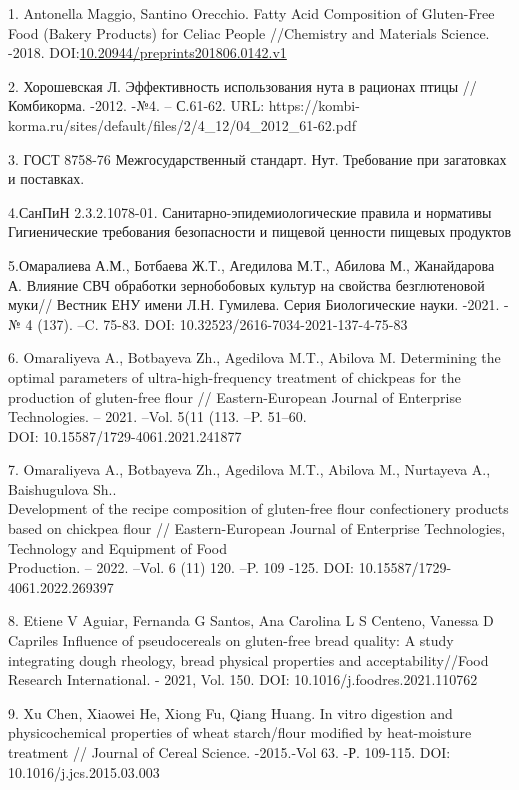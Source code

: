 	\begin{references}

1. Antonella Maggio, Santino Orecchio. Fatty Acid Composition of
Gluten-Free Food (Bakery Products) for Celiac People //Chemistry and
Materials Science. -2018.
DOI:\href{http://dx.doi.org/10.20944/preprints201806.0142.v1}{10.20944/preprints201806.0142.v1}

2. Хорошевская Л. Эффективность использования нута в рационах птицы //
Комбикорма. -2012. -№4. -- С.61-62. URL:
https://kombi-korma.ru/sites/default/files/2/4\_12/04\_2012\_61-62.pdf

3. ГОСТ 8758-76 Межгосударственный стандарт. Нут. Требование при
загатовках и поставках.

4.СанПиН 2.3.2.1078-01. Санитарно-эпидемиологические правила и нормативы
Гигиенические требования безопасности и пищевой ценности пищевых
продуктов

5.Омаралиева А.М., Ботбаева Ж.Т., Агедилова М.Т., Абилова М.,
Жанайдарова А. Влияние СВЧ обработки зернобобовых культур на свойства
безглютеновой муки// Вестник ЕНУ имени Л.Н. Гумилева. Серия
Биологические науки. -2021. -№ 4 (137). --C. 75-83. DOI:
10.32523/2616-7034-2021-137-4-75-83

6. Omaraliyeva A., Botbayeva Zh., Agedilova M.T., Abilova M. Determining
the optimal parameters of ultra-high-frequency treatment of chickpeas
for the production of gluten-free flour // Eastern-European Journal of
Enterprise Technologies. -- 2021. --Vol. 5(11 (113. --P. 51--60. \\DOI:
10.15587/1729-4061.2021.241877

7. Omaraliyeva A., Botbayeva Zh., Agedilova M.T., Abilova M., Nurtayeva
A., Baishugulova Sh.. \\Development of the recipe composition of
gluten-free flour confectionery products based on chickpea flour //
Eastern-European Journal of Enterprise Technologies, Technology and
Equipment of Food \\Production. -- 2022. --Vol. 6 (11) 120. --P. 109 -125.
DOI: 10.15587/1729-4061.2022.269397

8. Etiene V Aguiar, Fernanda G Santos, Ana Carolina L S Centeno, Vanessa
D Capriles Influence of pseudocereals on gluten-free bread quality: A
study integrating dough rheology, bread physical properties and
acceptability//Food Research International. - 2021, Vol. 150. DOI:
10.1016/j.foodres.2021.110762

9. Xu Chen, Xiaowei He, Xiong Fu, Qiang Huang. In vitro digestion and
physicochemical properties of wheat starch/flour modified by
heat-moisture treatment // Journal of Cereal Science. -2015.-Vol 63. -Р.
109-115. DOI: 10.1016/j.jcs.2015.03.003


\end{references}
